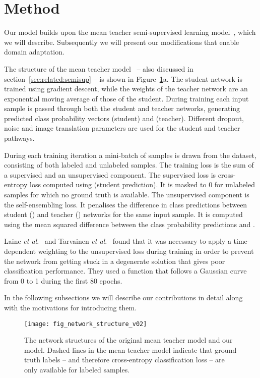 \documentclass{article}
\newcommand{\etal}{\textit{et al}.}
\begin{document}
\section{Method}
\label{sec:method}

Our model builds upon the mean teacher semi-supervised learning model~\cite{Tarvainen:Mean}, which we will describe. Subsequently we will present our modifications that enable domain adaptation.

The structure of the mean teacher model~\cite{Tarvainen:Mean} -- also discussed in section~\ref{sec:related:semisup} -- is shown in Figure~\ref{fig:net_structure}a. The student network is trained using gradient descent, while the weights of the teacher network are an exponential moving average of those of the student. During training each input sample  is passed through both the student and teacher networks, generating predicted class probability vectors  (student) and  (teacher). Different dropout, noise and image translation parameters are used for the student and teacher pathways.

During each training iteration a mini-batch of samples is drawn from the dataset, consisting of both labeled and unlabeled samples. The training loss is the sum of a supervised and an unsupervised component. The supervised loss is cross-entropy loss computed using  (student prediction). It is masked to 0 for unlabeled samples for which no ground truth is available. The unsupervised component is the self-ensembling loss. It penalises the difference in class predictions between student () and teacher () networks for the same input sample. It is computed using the mean squared difference between the class probability predictions  and .

Laine \etal~\cite{Laine:Temporal} and Tarvainen \etal~\cite{Tarvainen:Mean} found that it was necessary to apply a time-dependent weighting to the unsupervised loss during training in order to prevent the network from getting stuck in a degenerate solution that gives poor classification performance. They used a function that follows a Gaussian curve from 0 to 1 during the first 80 epochs.

In the following subsections we will describe our contributions in detail along with the motivations for introducing them.


\begin{figure}
  \centering
  \texttt{[image: fig\_network\_structure\_v02]}
  \caption{The network structures of the original mean teacher model and our model. Dashed lines in the mean teacher model indicate that ground truth labels -- and therefore cross-entropy classification loss -- are only available for labeled samples.} 
\label{fig:net_structure}
\end{figure}
\end{document}

